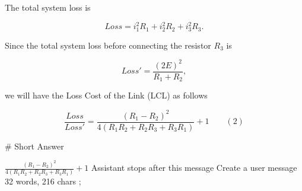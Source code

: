 The total system loss is

$$Loss = i_1^2R_1 +  i_2^2R_2+ i_3^2R_3.$$

Since the total system loss before connecting the resistor $R_3$ is

$$Loss' = \frac{(2E)^2}{R_1+R_2},$$

we will have the Loss Cost of the Link (LCL) as follows

$$\frac{Loss}{Loss'} = \frac{(R_1-R_2)^2}{4(R_1R_2+R_2R_3+R_3R_1)}+1 \qquad (2)$$

# Short Answer

$\frac{(R_1-R_2)^2}{4(R_1R_2+R_2R_3+R_3R_1)}+1$ Assistant stops after this message Create a user message 32 words, 216 chars ;
